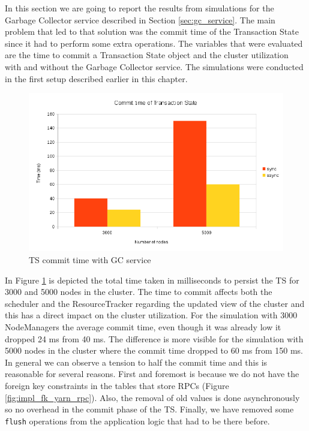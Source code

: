 In this section we are going to report the results from simulations
for the Garbage Collector service described in Section
\ref{sec:gc_service}. The main problem that led to that solution was
the commit time of the Transaction State since it had to perform some
extra operations. The variables that were evaluated are the time to
commit a Transaction State object and the cluster utilization with and
without the Garbage Collector service. The simulations were conducted
in the first setup described earlier in this chapter.

\begin{figure}
\centering
\includegraphics[scale=0.7]{resources/images/Evaluation/ts_commit_sync_async.png}
\caption{TS commit time with GC service}
\label{fig:ev_ts_sync_async}
\end{figure}

In Figure \ref{fig:ev_ts_sync_async} is depicted the total time taken
in milliseconds to persist the TS for 3000 and 5000 nodes in the
cluster. The time to commit affects both the scheduler and the
ResourceTracker regarding the updated view of the cluster and this has
a direct impact on the cluster utilization. For the simulation with
3000 NodeManagers the average commit time, even though it was already
low it dropped 24 ms from 40 ms. The difference is more visible
for the simulation with 5000 nodes in the cluster where the commit
time dropped to 60 ms from 150 ms. In general we can observe a tension
to half the commit time and this is reasonable for several
reasons. First and foremost is because we do not have the foreign key
constraints in the tables that store RPCs (Figure
\ref{fig:impl_fk_yarn_rpc}). Also, the removal of old values is done
asynchronously so no overhead in the commit phase of the TS. Finally,
we have removed some \texttt{flush} operations from the application
logic that had to be there before.


